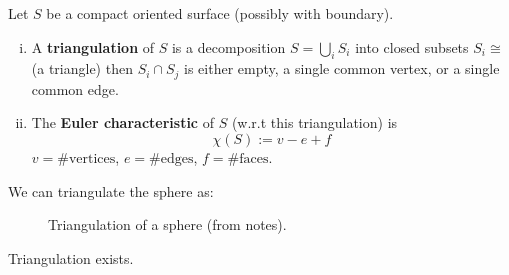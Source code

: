 \documentclass{article}
\begin{document}
Let $S$ be a compact oriented surface (possibly with boundary).
\begin{definition}
    \begin{enumerate}[(i)]
        \item A \textbf{triangulation} of $S$ is a decomposition $S = \bigcup_i S_i$ into closed subsets $S_i \cong$ (a triangle)
        then $S_i \cap S_j$ is either empty, a single common vertex, or a single common edge.
        \item The \textbf{Euler characteristic} of $S$ (w.r.t this triangulation) is
        \[
        \chi(S) := v - e + f
        \]
        $v = \# \text{vertices}$, $e = \# \text{edges}$, $f = \# \text{faces}$.
    \end{enumerate}
\end{definition}

\begin{example}
    We can triangulate the sphere as:
    \begin{figure}[H]
        \centering
        \caption{Triangulation of a sphere (from notes).}
    \end{figure}
\end{example}

\begin{theorem*}
    Triangulation exists.
\end{theorem*}
\end{document}
